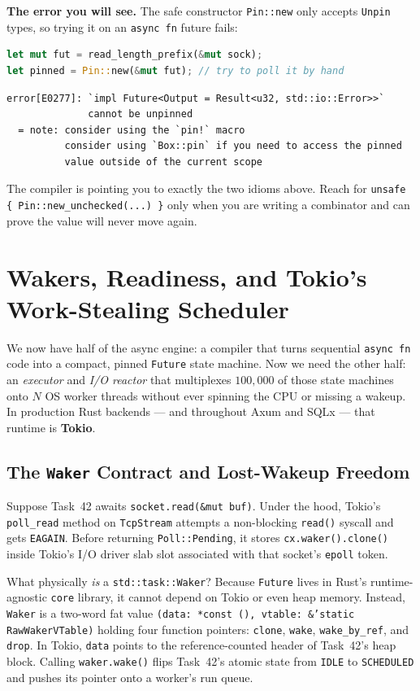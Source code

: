 \begin{trapbox}
\textbf{The error you will see.} The safe constructor \texttt{Pin::new} only accepts \texttt{Unpin} types, so trying it on an \texttt{async fn} future fails:
\begin{lstlisting}[language=Rust]
let mut fut = read_length_prefix(&mut sock);
let pinned = Pin::new(&mut fut); // try to poll it by hand
\end{lstlisting}
\begin{lstlisting}[language=Plain]
error[E0277]: `impl Future<Output = Result<u32, std::io::Error>>`
              cannot be unpinned
  = note: consider using the `pin!` macro
          consider using `Box::pin` if you need to access the pinned
          value outside of the current scope
\end{lstlisting}
The compiler is pointing you to exactly the two idioms above. Reach for \texttt{unsafe \{ Pin::new\_unchecked(...) \}} only when you are writing a combinator and can prove the value will never move again.
\end{trapbox}

\section{Wakers, Readiness, and Tokio's Work-Stealing Scheduler}
\label{ch12:tokio-scheduler}

We now have half of the async engine: a compiler that turns sequential \texttt{async fn} code into a compact, pinned \texttt{Future} state machine. Now we need the other half: an \emph{executor} and \emph{I/O reactor} that multiplexes $100{,}000$ of those state machines onto $N$ OS worker threads without ever spinning the CPU or missing a wakeup. In production Rust backends --- and throughout Axum and SQLx --- that runtime is \textbf{Tokio}.

\subsection{The \texttt{Waker} Contract and Lost-Wakeup Freedom}

Suppose Task~42 awaits \texttt{socket.read(\&mut buf)}. Under the hood, Tokio's \texttt{poll\_read} method on \texttt{TcpStream} attempts a non-blocking \texttt{read()} syscall and gets \texttt{EAGAIN}. Before returning \texttt{Poll::Pending}, it stores \texttt{cx.waker().clone()} inside Tokio's I/O driver slab slot associated with that socket's \texttt{epoll} token.

What physically \emph{is} a \texttt{std::task::Waker}? Because \texttt{Future} lives in Rust's runtime-agnostic \texttt{core} library, it cannot depend on Tokio or even heap memory. Instead, \texttt{Waker} is a two-word fat value \texttt{(data: *const (), vtable: \&'static RawWakerVTable)} holding four function pointers: \texttt{clone}, \texttt{wake}, \texttt{wake\_by\_ref}, and \texttt{drop}. In Tokio, \texttt{data} points to the reference-counted header of Task~42's heap block. Calling \texttt{waker.wake()} flips Task~42's atomic state from \texttt{IDLE} to \texttt{SCHEDULED} and pushes its pointer onto a worker's run queue.

